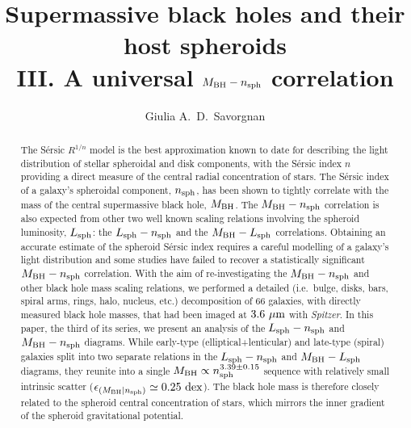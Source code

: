 \documentclass[preprint2]{emulateapj}
\begin{document}
\title{Supermassive black holes and their host spheroids \\ 
III. A universal $M_{\rm BH} - \lowercase{n_{\rm sph}}$ correlation }


\author{Giulia A.~D.~Savorgnan}


\begin{abstract}
The S\'ersic $R^{1/n}$ model is the best approximation known to date for describing the light distribution of stellar spheroidal and disk components, 
with the S\'ersic index $n$ providing a direct measure of the central radial concentration of stars. 
The S\'ersic index of a galaxy's spheroidal component, $n_{\rm sph}$, has been shown to tightly correlate 
with the mass of the central supermassive black hole, $M_{\rm BH}$. 
The $M_{\rm BH} - n_{\rm sph}$ correlation is also expected from other two well known scaling relations 
involving the spheroid luminosity, $L_{\rm sph}$: 
the $L_{\rm sph} - n_{\rm sph}$ and the $M_{\rm BH} - L_{\rm sph}$ correlations. 
Obtaining an accurate estimate of the spheroid S\'ersic index requires a careful modelling of a galaxy's light distribution 
and some studies have failed to recover a statistically significant $M_{\rm BH} - n_{\rm sph}$ correlation. 
With the aim of re-investigating the $M_{\rm BH} - n_{\rm sph}$ 
and other black hole mass scaling relations, 
we performed a detailed (i.e.~bulge, disks, bars, spiral arms, rings, halo, nucleus, etc.) 
decomposition of 66 galaxies, with directly measured black hole masses, 
that had been imaged at $3.6\rm~\mu m$ with \emph{Spitzer}. 
In this paper, the third of its series, we present an analysis of the $L_{\rm sph} - n_{\rm sph}$ and $M_{\rm BH} - n_{\rm sph}$ diagrams. 
While early-type (elliptical+lenticular) and late-type (spiral) galaxies split into two separate relations 
in the $L_{\rm sph} - n_{\rm sph}$ and $M_{\rm BH} - L_{\rm sph}$ diagrams, 
they reunite into a single $M_{\rm BH} \propto n_{\rm sph}^{3.39 \pm 0.15}$ sequence
with relatively small intrinsic scatter ($\epsilon_{(M_{\rm BH} | n_{\rm sph})} \simeq 0.25 \rm~dex$). 
The black hole mass is therefore closely related to the spheroid central concentration of stars, 
which mirrors the inner gradient of the spheroid gravitational potential. 
\end{abstract}


\end{document}
